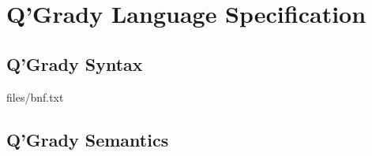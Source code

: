 \documentclass[report.tex]{subfiles}
\begin{document}
\chapter{Q'Grady Language Specification} %
\label{cha:q_grady_specification}
\section{Q'Grady Syntax} %
\label{sec:q_grady_syntax}

{files/bnf.txt} 

\section{Q'Grady Semantics} %
\label{sec:q_grady_semantics}

\newpage
\end{document}
